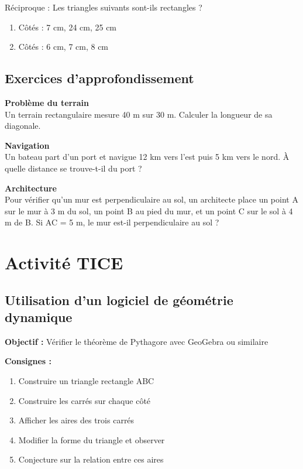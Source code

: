 \begin{exercisebox}[4]
Réciproque : Les triangles suivants sont-ils rectangles ?
\begin{enumerate}[label=\alph*)]
    \item Côtés : 7 cm, 24 cm, 25 cm
    \item Côtés : 6 cm, 7 cm, 8 cm
\end{enumerate}
\end{exercisebox}

\subsection{Exercices d'approfondissement}

\begin{exercisebox}[5]
\textbf{Problème du terrain}\\
Un terrain rectangulaire mesure 40 m sur 30 m. Calculer la longueur de sa diagonale.
\end{exercisebox}

\begin{exercisebox}[6]
\textbf{Navigation}\\
Un bateau part d'un port et navigue 12 km vers l'est puis 5 km vers le nord. À quelle distance se trouve-t-il du port ?
\end{exercisebox}

\begin{exercisebox}[7]
\textbf{Architecture}\\
Pour vérifier qu'un mur est perpendiculaire au sol, un architecte place un point A sur le mur à 3 m du sol, un point B au pied du mur, et un point C sur le sol à 4 m de B. Si AC = 5 m, le mur est-il perpendiculaire au sol ?
\end{exercisebox}

\section{Activité TICE}

\subsection{Utilisation d'un logiciel de géométrie dynamique}

\textbf{Objectif :} Vérifier le théorème de Pythagore avec GeoGebra ou similaire

\textbf{Consignes :}
\begin{enumerate}
    \item Construire un triangle rectangle ABC
    \item Construire les carrés sur chaque côté
    \item Afficher les aires des trois carrés
    \item Modifier la forme du triangle et observer
    \item Conjecture sur la relation entre ces aires
\end{enumerate}

